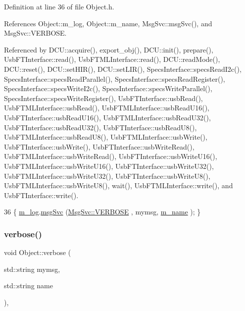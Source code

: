 Definition at line 36 of file Object.\+h.



References Object\+::m\+\_\+log, Object\+::m\+\_\+name, Msg\+Svc\+::msg\+Svc(), and Msg\+Svc\+::\+V\+E\+R\+B\+O\+SE.



Referenced by D\+C\+U\+::acquire(), export\+\_\+obj(), D\+C\+U\+::init(), prepare(), Usb\+F\+T\+Interface\+::read(), Usb\+F\+T\+M\+L\+Interface\+::read(), D\+C\+U\+::read\+Mode(), D\+C\+U\+::reset(), D\+C\+U\+::set\+H\+I\+R(), D\+C\+U\+::set\+L\+I\+R(), Specs\+Interface\+::specs\+Read\+I2c(), Specs\+Interface\+::specs\+Read\+Parallel(), Specs\+Interface\+::specs\+Read\+Register(), Specs\+Interface\+::specs\+Write\+I2c(), Specs\+Interface\+::specs\+Write\+Parallel(), Specs\+Interface\+::specs\+Write\+Register(), Usb\+F\+T\+Interface\+::usb\+Read(), Usb\+F\+T\+M\+L\+Interface\+::usb\+Read(), Usb\+F\+T\+M\+L\+Interface\+::usb\+Read\+U16(), Usb\+F\+T\+Interface\+::usb\+Read\+U16(), Usb\+F\+T\+M\+L\+Interface\+::usb\+Read\+U32(), Usb\+F\+T\+Interface\+::usb\+Read\+U32(), Usb\+F\+T\+Interface\+::usb\+Read\+U8(), Usb\+F\+T\+M\+L\+Interface\+::usb\+Read\+U8(), Usb\+F\+T\+M\+L\+Interface\+::usb\+Write(), Usb\+F\+T\+Interface\+::usb\+Write(), Usb\+F\+T\+Interface\+::usb\+Write\+Read(), Usb\+F\+T\+M\+L\+Interface\+::usb\+Write\+Read(), Usb\+F\+T\+Interface\+::usb\+Write\+U16(), Usb\+F\+T\+M\+L\+Interface\+::usb\+Write\+U16(), Usb\+F\+T\+Interface\+::usb\+Write\+U32(), Usb\+F\+T\+M\+L\+Interface\+::usb\+Write\+U32(), Usb\+F\+T\+Interface\+::usb\+Write\+U8(), Usb\+F\+T\+M\+L\+Interface\+::usb\+Write\+U8(), wait(), Usb\+F\+T\+M\+L\+Interface\+::write(), and Usb\+F\+T\+Interface\+::write().


\begin{DoxyCode}
36 \{ \hyperlink{classObject_a0d269813dd7ac1f24bc143031e2963f2}{m\_log}.\hyperlink{classMsgSvc_ad25f18047920cc59a314e5098259711c}{msgSvc} (\hyperlink{classMsgSvc_ae671eb7301996cd049d2da8a65925926af655256b06494ade5ba830abe5401ec9}{MsgSvc::VERBOSE} , mymsg, \hyperlink{classObject_a8b83c95c705d2c3ba0d081fe1710f48d}{m\_name} ); \}
\end{DoxyCode}
\mbox{\label{classObject_a2d4120195317e2a3c6532e8bb9f3da68}} 
\subsubsection{\texorpdfstring{verbose()}{verbose()}\hspace{0.1cm}{\footnotesize\ttfamily [2/2]}}
{\footnotesize\ttfamily void Object\+::verbose (\begin{DoxyParamCaption}\item[{std\+::string}]{mymsg,  }\item[{std\+::string}]{name }\end{DoxyParamCaption})\hspace{0.3cm}{\ttfamily [inline]}, {\ttfamily [inherited]}}




